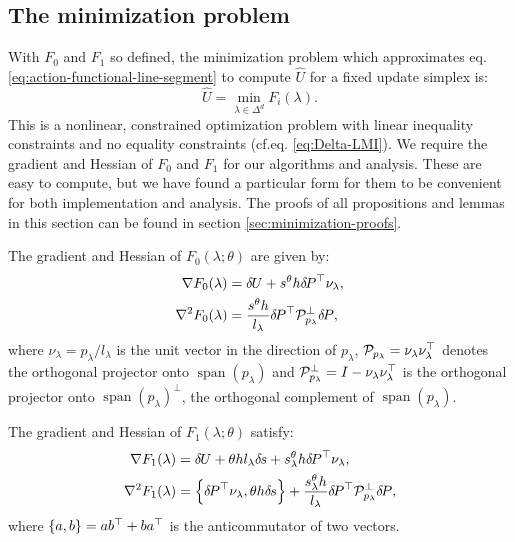 \documentclass[smallcondensed]{svjour3}
\begin{document}
\subsection{The minimization problem}\label{ssec:minimization-problem}

With $F_0$ and $F_1$ so defined, the minimization problem which
approximates eq.\@ \ref{eq:action-functional-line-segment} to
compute $\hat{U}$ for a fixed update simplex is:
\begin{equation}
  \label{eq:constrained-minimization}
  \hat{U} = \min_{\lambda \in \Delta^d} F_i(\lambda).
\end{equation}
This is a nonlinear, constrained optimization problem with linear
inequality constraints and no equality constraints (cf.\@ eq.\@
\ref{eq:Delta-LMI}). We require the gradient and Hessian of $F_0$ and
$F_1$ for our algorithms and analysis. These are easy to compute, but
we have found a particular form for them to be convenient for both
implementation and analysis. The proofs of all propositions and lemmas
in this section can be found in section\@
\ref{sec:minimization-proofs}.

\begin{proposition}\label{prop:F0-grad-and-Hess}
  The gradient and Hessian of $F_0(\lambda; \theta)$ are given by:
  \begin{align}
    \nabla F_0(\lambda) &= {\delta \hspace{-0.09em} U} + s^{\theta} h {\delta \hspace{-0.14em} P}^\top \nu_\lambda,\label{eq:F0-grad} \\
    \nabla^2 F_0(\lambda) &= \frac{s^{\theta} h}{l_\lambda} {\delta \hspace{-0.14em} P}^\top \mathcal{P}^\perp_{p_\lambda} {\delta \hspace{-0.14em} P},
  \end{align}
  where $\nu_\lambda = p_\lambda/l_\lambda$ is the unit vector in the
  direction of $p_\lambda$,
  $\mathcal{P}_{p_\lambda} = \nu_\lambda \nu_\lambda^\top$ denotes the
  orthogonal projector onto $\operatorname{span}(p_\lambda)$ and
  $\mathcal{P}_{p_\lambda}^\perp = I - \nu_\lambda \nu_\lambda^\top$ is the
  orthogonal projector onto $\operatorname{span}(p_\lambda)^\perp$,
  the orthogonal complement of $\operatorname{span}(p_\lambda)$.
\end{proposition}

\begin{proposition}\label{prop:F1-grad-and-Hess}
  The gradient and Hessian of $F_1(\lambda; \theta)$ satisfy:
  \begin{align}
    \nabla F_1(\lambda) &= {\delta \hspace{-0.09em} U} + \theta h l_\lambda {\delta \hspace{-0.1em} s} + s^{\theta}_\lambda h {\delta \hspace{-0.14em} P}^\top \nu_\lambda, \\
    \nabla^2 F_1(\lambda) &= \left\{{\delta \hspace{-0.14em} P}^\top \nu_\lambda, \theta h {\delta \hspace{-0.1em} s}\right\} + \frac{s^\theta_\lambda h}{l_\lambda} {\delta \hspace{-0.14em} P}^\top \mathcal{P}^\perp_{p_\lambda} {\delta \hspace{-0.14em} P}, \label{eq:hess-F1}
  \end{align}
  where $\left\{a, b\right\} = ab^\top + ba^\top$ is the anticommutator of two
  vectors.
\end{proposition}
\end{document}
